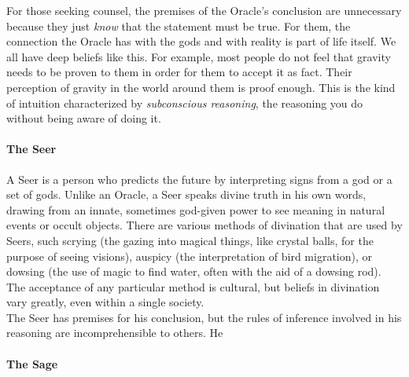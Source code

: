 For those seeking counsel, the premises of the Oracle's conclusion are unnecessary because they just \textit{know} that the statement must be true. For them, the connection the Oracle has with the gods and with reality is part of life itself. We all have deep beliefs like this. For example, most people do not feel that gravity needs to be proven to them in order for them to accept it as fact. Their perception of gravity in the world around them is proof enough. This is the kind of intuition characterized by \textit{subconscious reasoning}, the reasoning you do without being aware of doing it. \\

\paragraph{The Seer} \hspace*{1mm} \vspace*{2mm}

A Seer is a person who predicts the future by interpreting signs from a god or a set of gods. Unlike an Oracle, a Seer speaks divine truth in his own words, drawing from an innate, sometimes god-given power to see meaning in natural events or occult objects. There are various methods of divination that are used by Seers, such scrying (the gazing into magical things, like crystal balls, for the purpose of seeing visions), auspicy (the interpretation of bird migration), or dowsing (the use of magic to find water, often with the aid of a dowsing rod). The acceptance of any particular method is cultural, but beliefs in divination vary greatly, even within a single society. \\

The Seer has premises for his conclusion, but the rules of inference involved in his reasoning are incomprehensible to others. He 

\paragraph{The Sage} \hspace*{1mm} \vspace*{2mm}


